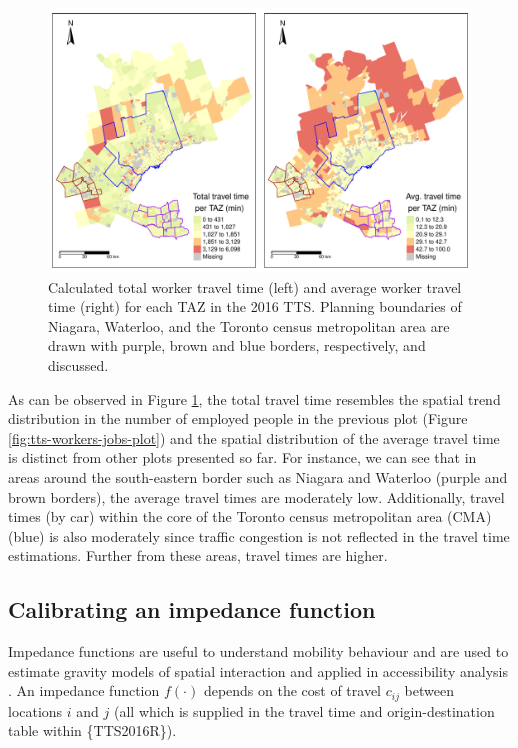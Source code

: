 \documentclass[Royal,times,sageh]{sagej}
\begin{document}
\begin{figure}
\includegraphics[width=1\linewidth]{Manuscript-Data-Package_files/figure-latex/plot-tt-ttpertrip-1} \caption{\label{fig:plot-tt-ttpertrip}Calculated total worker travel time (left) and average worker travel time (right) for each TAZ in the 2016 TTS. Planning boundaries of Niagara, Waterloo, and the Toronto census metropolitan area are drawn with purple, brown and blue borders, respectively, and discussed. }\label{fig:plot-tt-ttpertrip}
\end{figure}
\newpage

As can be observed in Figure \ref{fig:plot-tt-ttpertrip}, the total
travel time resembles the spatial trend distribution in the number of
employed people in the previous plot (Figure
\ref{fig:tts-workers-jobs-plot}) and the spatial distribution of the
average travel time is distinct from other plots presented so far. For
instance, we can see that in areas around the south-eastern border such
as Niagara and Waterloo (purple and brown borders), the average travel
times are moderately low. Additionally, travel times (by car) within the
core of the Toronto census metropolitan area (CMA) (blue) is also
moderately since traffic congestion is not reflected in the travel time
estimations. Further from these areas, travel times are higher.

\hypertarget{calibrating-an-impedance-function}{%
\subsection{Calibrating an impedance
function}\label{calibrating-an-impedance-function}}

Impedance functions are useful to understand mobility behaviour and are
used to estimate gravity models of spatial interaction
\citep{wilson1971, haynes_gravity_1985} and applied in accessibility
analysis
\citep{hansen_how_1959, talen_assessing_1998, paez_jobs_2013, barboza_balancing_2021}.
An impedance function \(f(\cdot)\) depends on the cost of travel
\(c_{ij}\) between locations \(i\) and \(j\) (all which is supplied in
the travel time and origin-destination table within \{TTS2016R\}).
\end{document}
